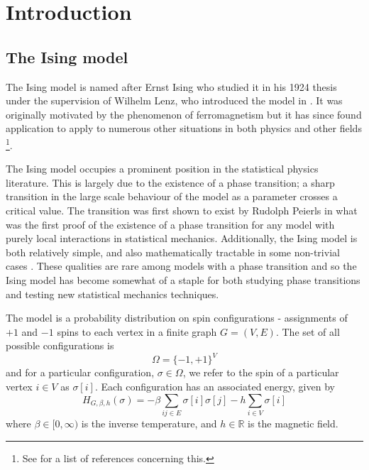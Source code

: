 \chapter{Introduction}
\label{Ch:CouplingIntro}



\section{The Ising model}
\label{sec:Ising}
	The Ising model is named after Ernst Ising who studied it in his 1924 thesis \cite{Ising1925-nd} under the supervision of Wilhelm Lenz, who introduced the model in \cite{Lenz1920-bn}. It was originally motivated by the phenomenon of ferromagnetism but it has since found application to apply to numerous other situations in both physics and other fields \footnote{See \cite[notes of Section 1.4.2]{Friedli2017-xm} for a list of references concerning this.}.

	The Ising model occupies a prominent position in the statistical physics literature. This is largely due to the existence of a phase transition; a sharp transition in the large scale behaviour of the model as a parameter crosses a critical value. The transition was first shown to exist by Rudolph Peierls \cite{Peierls1936-pu} in what was the first proof of the existence of a phase transition for any model with purely local interactions in statistical mechanics.
	Additionally, the Ising model is both relatively simple, and also mathematically tractable in some non-trivial cases \cite{Onsager1944-li}. These qualities are rare among models with a phase transition and so the Ising model has become somewhat of a staple for both studying phase transitions and testing new statistical mechanics techniques.

	The model is a probability distribution on spin configurations - assignments of $+1$ and $-1$ spins to each vertex in a finite graph $G = (V, E)$. The set of all possible configurations is
	\begin{equation}
		\Omega = \{-1, +1\}^V
	\end{equation}
	and for a particular configuration, $\sigma \in \Omega$, we refer to the spin of a particular vertex $i \in V$ as $\sigma[i]$. Each configuration has an associated energy, given by 
	\begin{equation}
		H_{G, \beta, h}(\sigma) = -\beta \sum_{ij \in E} \sigma[i] \sigma[j] - h\sum_{i \in V} \sigma[i]
	\end{equation}
	where $\beta \in [0, \infty)$ is the inverse temperature, and $h \in \mathbb{R}$ is the magnetic field. 

